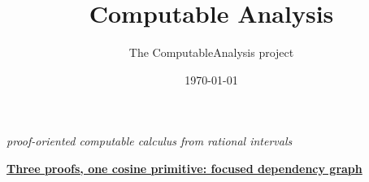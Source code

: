 \documentclass[11pt]{report}
\title{Computable Analysis}
\author{The ComputableAnalysis project}
\date{\today}
\begin{document}
\maketitle
\begin{center}
{\large\itshape proof-oriented computable calculus from rational intervals}

\href{cosine-primitive-graph.html}{\textbf{Three proofs, one cosine primitive: focused dependency graph}}
\end{center}





\end{document}
